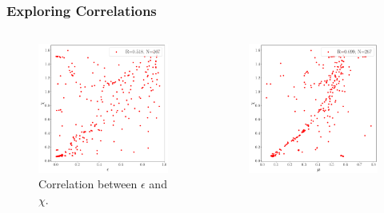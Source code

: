 \documentclass{beamer}
\begin{document}
\begin{frame}
\frametitle{Exploring Correlations}
\begin{columns}
\begin{column}{0.5\textwidth}
\begin{figure}
\centering 
\includegraphics[width=\textwidth]{im/eps_v_chi_}
\caption{Correlation between $\epsilon$ and $\chi$.}
\end{figure}
\end{column}
\begin{column}{0.5\textwidth}
\begin{figure}
\centering 
\includegraphics[width=\textwidth]{im/mu_v_chi_}

\end{figure}
\end{column}
\end{columns}
\end{frame}
\end{document}

